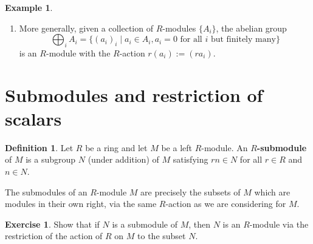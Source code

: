 \documentclass[12pt]{report}
\numberwithin{equation}{section}
\numberwithin{theorem}{chapter}
\theoremstyle{definition}
\newtheorem{definition}[theorem]{Definition}
\newtheorem{example}[theorem]{Example}
\newtheorem{exercise}{Exercise}
\newtheorem*{basic properties}{Basic Properties}
\newtheorem*{Important Remark}{Important Remark}
\newcommand{\df}[1]{{\bf #1}\index{#1}}
\begin{document}
\begin{example}
\begin{enumerate}[label=(\arabic*)]
$$\begin{bmatrix} r_1\\ \vdots\\r_n \end{bmatrix} +\begin{bmatrix} r'_1\\ \vdots\\r'_n \end{bmatrix} =\begin{bmatrix} r_1+r'_1\\ \vdots\\r_n +r'_n\end{bmatrix} \text{ and } r\begin{bmatrix} r_1\\ \vdots\\r_n \end{bmatrix}=\begin{bmatrix} rr_1\\ \vdots\\ rr_n \end{bmatrix}. $$
We will often write the elements of $R^n$ as $n$-tuples $(r_1, \ldots, r_n)$ instead. Notice that $R$ is the free $R$-module of rank $1$.
\item More generally, given a collection of $R$-modules $\{ A_i \}$, the abelian group
$$\bigoplus_i A_i = \{ (a_i)_i \mid a_i \in A_i, a_i = 0 \textrm{ for all $i$ but finitely many} \}$$
is an $R$-module with the $R$-action $r(a_i) := (ra_i)$.
\end{enumerate}
\end{example}




\section{Submodules and restriction of scalars}

\begin{definition} 
Let $R$ be a ring and let $M$ be a left $R$-module. An \df{$R$-submodule} of $M$ is a subgroup $N$ (under addition) of $M$ satisfying $rn \in N$ for all $r \in R$ and $n \in N$.
\end{definition}

The submodules of an $R$-module $M$ are precisely the subsets of $M$ which are modules in their own right, via the same $R$-action as we are considering for $M$.

\begin{exercise}
	Show that if $N$ is a submodule of $M$, then $N$ is an $R$-module via the restriction of the action of $R$ on $M$ to the subset $N$.
\end{exercise}
\end{document}
